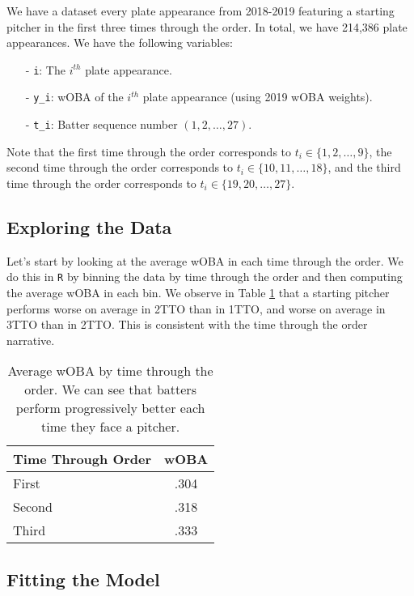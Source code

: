 \documentclass[twoside]{article}
\theoremstyle{definition}
\begin{document}
We have a dataset every plate appearance from 2018-2019 featuring a starting pitcher in the first three times through the order. In total, we have 214,386 plate appearances. We have the following variables:
\begin{itemize}
    \item[-] \texttt{i}: The $i^{th}$ plate appearance.
    \item[-] \texttt{y\_i}: wOBA of the $i^{th}$ plate appearance (using 2019 wOBA weights).
    \item[-] \texttt{t\_i}: Batter sequence number $(1, 2, \hdots, 27)$.
\end{itemize}
Note that the first time through the order corresponds to $t_i \in \{1, 2, \hdots, 9\}$, the second time through the order corresponds to $t_i \in \{10, 11, \hdots, 18\}$, and the third time through the order corresponds to $t_i \in \{19, 20, \hdots, 27\}$.

\subsection{Exploring the Data}

Let's start by looking at the average wOBA in each time through the order. We do this in \texttt{R} by binning the data by time through the order and then computing the average wOBA in each bin. We observe in Table \ref{tab:ttop_woba} that a starting pitcher performs worse on average in 2TTO than in 1TTO, and worse on average in 3TTO than in 2TTO. This is consistent with the time through the order narrative.
\begin{table}[H]
    \centering
    \begin{tabular}{lc}
        \hline
        Time Through Order & wOBA \\
        \hline
        First & .304 \\
        Second & .318 \\
        Third & .333 \\
        \hline
    \end{tabular}
    \caption{Average wOBA by time through the order. We can see that batters perform progressively better each time they face a pitcher.}
    \label{tab:ttop_woba}
\end{table}

\subsection{Fitting the Model}
\end{document}

